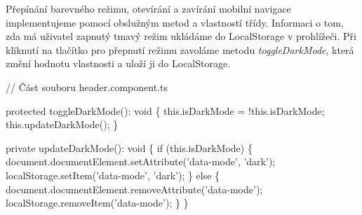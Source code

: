 Přepínání barevného režimu, otevírání a zavírání mobilní navigace implementujeme pomocí obslužným metod a vlastností třídy. 
Informaci o tom, zda má uživatel zapnutý tmavý režim ukládáme do LocalStorage v prohlížeči. 
Při kliknutí na tlačítko pro přepnutí režimu zavoláme metodu \emph{toggleDarkMode}, která změní hodnotu vlastnosti a uloží ji do LocalStorage.

\begin{prog}
// Část souboru header.component.ts

protected toggleDarkMode(): void \{
  this.isDarkMode = !this.isDarkMode;
  this.updateDarkMode();
\}

private updateDarkMode(): void \{
  if (this.isDarkMode) \{
    document.documentElement.setAttribute('data-mode', 'dark');
    localStorage.setItem('data-mode', 'dark');
  \} else \{
    document.documentElement.removeAttribute('data-mode');
    localStorage.removeItem('data-mode');
  \}
\}
\end{prog}